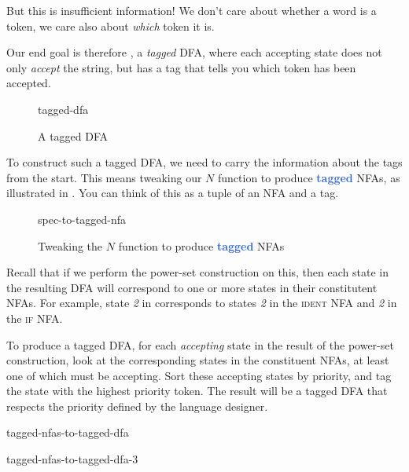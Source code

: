 But this is insufficient information! We don't care about whether a word is a token, we care also about \emph{which} token it is.

Our end goal is therefore , a \emph{tagged} DFA, where each accepting state does not only \emph{accept} the string, but has a tag that tells you which token has been accepted.

\begin{figure}[H]
    \centering
    {tagged-dfa}
    \caption{A tagged DFA}
    \label{fig:tagged-dfa}
\end{figure}

To construct such a tagged DFA, we need to carry the information about the tags from the start. This means tweaking our $N$ function to produce \textbf{\textcolor{highlight}{tagged}} NFAs, as illustrated in . You can think of this as a tuple of an NFA and a tag.

\begin{figure}[H]
    \centering
    {spec-to-tagged-nfa}
    \caption{Tweaking the $N$ function to produce \textbf{\textcolor{highlight}{tagged}} NFAs}
    \label{fig:tagged-nfas}
\end{figure}

Recall that if we perform the power-set construction on this, then each state in the resulting DFA will correspond to one or more states in their constitutent NFAs. For example, state \emph{2} in  corresponds to states \emph{2} in the \textsc{ident} NFA and \emph{2} in the \textsc{if} NFA.

To produce a tagged DFA, for each \emph{accepting} state in the result of the power-set construction, look at the corresponding states in the constituent NFAs, at least one of which must be accepting. Sort these accepting states by priority, and tag the state with the highest priority token. The result will be a tagged DFA that respects the priority defined by the language designer.

\begin{minipage}[t]{0.5\textwidth}
    \begin{center}
    {tagged-nfas-to-tagged-dfa}
    \end{center}
\end{minipage}%
\begin{minipage}[t]{0.5\textwidth}
    \begin{center}
    {tagged-nfas-to-tagged-dfa-3}
    \end{center}
\end{minipage}

